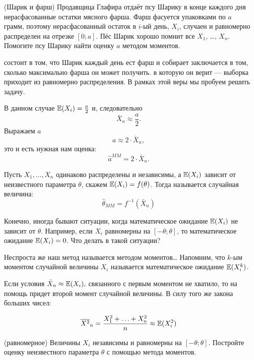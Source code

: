 \documentclass[12pt, a4paper, oneside]{article}
\begin{document}
\begin{problem}{(Шарик и фарш)}
Продавщица Глафира отдаёт псу Шарику в конце каждого дня нерасфасованные остатки мясного фарша. Фарш фасуется упаковками по $a$ грамм, поэтому нерасфасованный остаток в $i$-ый день, $X_i$, случаен и равномерно распределен на отрезке $[0;a]$. Пёс Шарик хорошо помнит все $X_1$, \ldots, $X_n$. Помогите псу Шарику найти оценку $a$ методом моментов.
\end{problem}

\begin{sol}
 состоит в том, что Шарик каждый день ест фарш и собирает   заключается в том, сколько максимально фарша он может получить.  в которую он верит --- выборка приходит из равномерно распределения. В рамках этой веры мы пробуем решить задачу.

В данном случае $ \mathbb{E}(X_{i})=\frac{a}{2} $ и, следовательно
\[ \bar{X}_{n}\approx \frac{a}{2}. \]
Выражаем $a$
\[ a \approx 2 \cdot \bar{X}_{n}, \]
это и есть нужная нам оценка:
\[ \hat{a}^{MM}= 2 \cdot \bar{X}_{n}. \]
\end{sol}

\begin{definition} 
Пусть $X_1, \ldots, X_n$ одинаково распределены и независимы, а $\mathbb{E}(X_{i})$ зависит от неизвестного параметра $\theta$, скажем $\mathbb{E}(X_{i}) = f(\theta)$. Тогда  называется случайная величина:
\[ \hat{\theta}_{MM} = f^{-1}(\bar{X}_{n}) \]
\end{definition} 

Конечно, иногда бывают ситуации, когда математическое ожидание $\mathbb{E}(X_{i})$ не зависит от $\theta$. Например, если $X_{i}$ равномерны на $[-\theta; \theta]$, то математическое ожидание $\mathbb{E}(X_{i}) = 0$. Что делать в такой ситуации? 

Неспроста же наш метод называется методом моментов\ldots{}  Напомним, что $k$-ым моментом случайной величины $X_{i}$ называется математическое ожидание $\mathbb{E}(X_{i}^{k})$. 

Если условия $\bar{X}_{n}\approx \mathbb{E}(X_{i}),$ связанного с первым моментом не хватило, то на помощь придет второй момент случайной величины. В силу того же закона больших чисел:

\[\overline{X^2}_n = \frac{X_{1}^{2} + \ldots + X_{n}^{2}}{n} \approx \mathbb{E}(X_{i}^{2})\]

\begin{problem}{(равномерное)}
Величины $ X_{i} $ независимы и равномерны на $ [-\theta;\theta] $. Постройте оценку неизвестного параметра $\theta$ с помощью метода моментов.
\end{problem}
\end{document}
